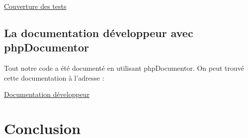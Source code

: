 \documentclass{report}
\begin{document}
			\href{http://ares-ensiie.eu/~unbekandt2011/UnsapaIPW/cov}{Couverture des tests}
    \subsection{La documentation développeur avec phpDocumentor}
			Tout notre code a été documenté en utilisant phpDocumentor. On peut trouvé cette documentation à l'adresse :

			\href{http://ares-ensiie.eu/~unbekandt2011/UnsapaIPW/doc}{Documentation développeur}

  \section*{Conclusion}
\end{document}
